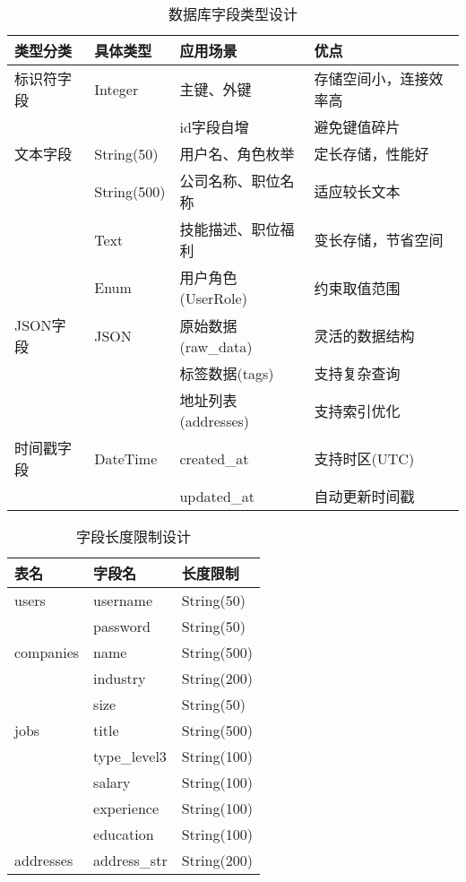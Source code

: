 \begin{table}[!htbp]
  \caption{数据库字段类型设计}
  \label{tab:field_types}
  \centering
  \begin{tabular}{@{}llll@{}} \toprule
    \textbf{类型分类} & \textbf{具体类型} & \textbf{应用场景} & \textbf{优点} \\ \midrule
    标识符字段 & Integer & 主键、外键 & 存储空间小，连接效率高 \\
              &         & id字段自增 & 避免键值碎片 \\ \midrule
    文本字段   & String(50) & 用户名、角色枚举 & 定长存储，性能好 \\
              & String(500) & 公司名称、职位名称 & 适应较长文本 \\
              & Text & 技能描述、职位福利 & 变长存储，节省空间 \\
              & Enum & 用户角色(UserRole) & 约束取值范围 \\ \midrule
    JSON字段   & JSON & 原始数据(raw\_data) & 灵活的数据结构 \\
              &      & 标签数据(tags) & 支持复杂查询 \\
              &      & 地址列表(addresses) & 支持索引优化 \\ \midrule
    时间戳字段 & DateTime & created\_at & 支持时区(UTC) \\
              &          & updated\_at & 自动更新时间戳 \\ \bottomrule
  \end{tabular}
\end{table}

\begin{table}[!htbp]
  \caption{字段长度限制设计}
  \label{tab:field_lengths}
  \centering
  \begin{tabular}{@{}lll@{}} \toprule
    \textbf{表名} & \textbf{字段名} & \textbf{长度限制} \\ \midrule
    users & username & String(50) \\
          & password & String(50) \\ \midrule
    companies & name & String(500) \\
             & industry & String(200) \\
             & size & String(50) \\ \midrule
    jobs & title & String(500) \\
         & type\_level3 & String(100) \\
         & salary & String(100) \\
         & experience & String(100) \\
         & education & String(100) \\ \midrule
    addresses & address\_str & String(200) \\ \bottomrule
  \end{tabular}
\end{table}


